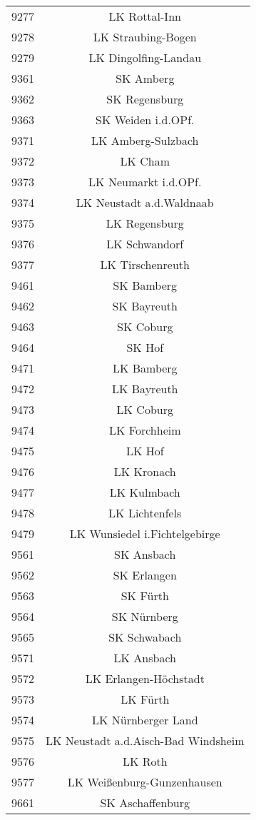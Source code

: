 \begin{tabular}{c c}
    9277&LK Rottal-Inn\\ 
    9278&LK Straubing-Bogen\\ 
    9279&LK Dingolfing-Landau\\ 
    9361&SK Amberg\\ 
    9362&SK Regensburg\\ 
    9363&SK Weiden i.d.OPf.\\ 
    9371&LK Amberg-Sulzbach\\ 
    9372&LK Cham\\ 
    9373&LK Neumarkt i.d.OPf.\\ 
    9374&LK Neustadt a.d.Waldnaab\\ 
    9375&LK Regensburg\\ 
    9376&LK Schwandorf\\ 
    9377&LK Tirschenreuth\\ 
    9461&SK Bamberg\\ 
    9462&SK Bayreuth\\ 
    9463&SK Coburg\\ 
    9464&SK Hof\\ 
    9471&LK Bamberg\\ 
    9472&LK Bayreuth\\ 
    9473&LK Coburg\\ 
    9474&LK Forchheim\\ 
    9475&LK Hof\\ 
    9476&LK Kronach\\ 
    9477&LK Kulmbach\\ 
    9478&LK Lichtenfels\\ 
    9479&LK Wunsiedel i.Fichtelgebirge\\ 
    9561&SK Ansbach\\ 
    9562&SK Erlangen\\ 
    9563&SK Fürth\\ 
    9564&SK Nürnberg\\ 
    9565&SK Schwabach\\ 
    9571&LK Ansbach\\ 
    9572&LK Erlangen-Höchstadt\\ 
    9573&LK Fürth\\ 
    9574&LK Nürnberger Land\\ 
    9575&LK Neustadt a.d.Aisch-Bad Windsheim\\ 
    9576&LK Roth\\ 
    9577&LK Weißenburg-Gunzenhausen\\ 
    9661&SK Aschaffenburg\\ 

\end{tabular}
